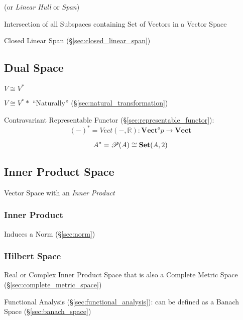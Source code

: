 (or \emph{Linear Hull} or \emph{Span})

Intersection of all Subspaces containing Set of Vectors in a Vector
Space

Closed Linear Span (\S\ref{sec:closed_linear_span})



\subsection{Dual Space}\label{sec:dual_space}

$V \cong V^*$

$V \cong V^**$ ``Naturally'' (\S\ref{sec:natural_transformation})

Contravariant Representable Functor
(\S\ref{sec:representable_functor}):
\[
  (-)^* = Vect(-,\mathbb{R}) :
    \mathbf{Vect}^op \rightarrow \mathbf{Vect}
\]

\[
  A^* = \mathscr{P}(A) \cong \mathbf{Set}(A,2)
\]\cite{awodey06}



\subsection{Inner Product Space}\label{sec:innerproduct_space}

Vector Space with an \emph{Inner Product}



\subsubsection{Inner Product}\label{sec:inner_product}

Induces a Norm (\S\ref{sec:norm})



\subsubsection{Hilbert Space}\label{sec:hilbert_space}

Real or Complex Inner Product Space that is also a Complete Metric
Space (\S\ref{sec:complete_metric_space})

Functional Analysis (\S\ref{sec:functional_analysis}): can be defined
as a Banach Space (\S\ref{sec:banach_space})



